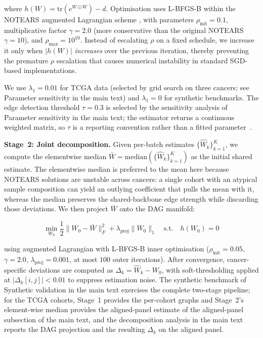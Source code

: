 \documentclass[11pt]{article}
\begin{document}
where $h(W) = \text{tr}(e^{W \odot W}) - d$. Optimisation uses L-BFGS-B \citep{byrd1995lbfgsb} within the NOTEARS augmented Lagrangian scheme \citep{zheng2018dags}, with parameters $\rho_{\text{init}} = 0.1$, multiplicative factor $\gamma = 2.0$ (more conservative than the original NOTEARS $\gamma = 10$), and $\rho_{\text{max}} = 10^{10}$. Instead of escalating $\rho$ on a fixed schedule, we increase it only when $|h(W)|$ \emph{increases} over the previous iteration, thereby preventing the premature $\rho$ escalation that causes numerical instability in standard SGD-based implementations.

We use $\lambda_1 = 0.01$ for TCGA data (selected by grid search on three cancers; see Parameter sensitivity in the main text) and $\lambda_1 = 0$ for synthetic benchmarks. The edge detection threshold $\tau = 0.3$ is selected by the sensitivity analysis of Parameter sensitivity in the main text; the estimator returns a continuous weighted matrix, so $\tau$ is a reporting convention rather than a fitted parameter~\citep{zheng2018dags}.

\textbf{Stage~2: Joint decomposition.} Given per-batch estimates $\{\hat{W}_k\}_{k=1}^K$, we compute the elementwise median $\bar{W} = \text{median}(\{\hat{W}_k\}_{k=1}^K)$ as the initial shared estimate. The elementwise median is preferred to the mean here because NOTEARS solutions are unstable across cancers: a single cohort with an atypical sample composition can yield an outlying coefficient that pulls the mean with it, whereas the median preserves the shared-backbone edge strength while discarding those deviations. We then project $\bar{W}$ onto the DAG manifold:

\begin{equation}
\min_{W_0} \frac{1}{2}\|W_0 - \bar{W}\|_F^2 + \lambda_{\text{proj}}\|W_0\|_1 \quad \text{s.t.} \quad h(W_0) = 0
\label{eq:stage2}
\end{equation}

using augmented Lagrangian with L-BFGS-B inner optimisation ($\rho_{\text{init}} = 0.05$, $\gamma = 2.0$, $\lambda_{\text{proj}} = 0.001$, at most $100$ outer iterations). After convergence, cancer-specific deviations are computed as $\Delta_k = \hat{W}_k - W_0$, with soft-thresholding applied at $|\Delta_k[i,j]| < 0.01$ to suppress estimation noise. The synthetic benchmark of Synthetic validation in the main text exercises the complete two-stage pipeline; for the TCGA cohorts, Stage~1 provides the per-cohort graphs and Stage~2's element-wise median provides the aligned-panel estimate of the aligned-panel subsection of the main text, and the decomposition analysis in the main text reports the DAG projection and the resulting $\Delta_k$ on the aligned panel.
\end{document}
